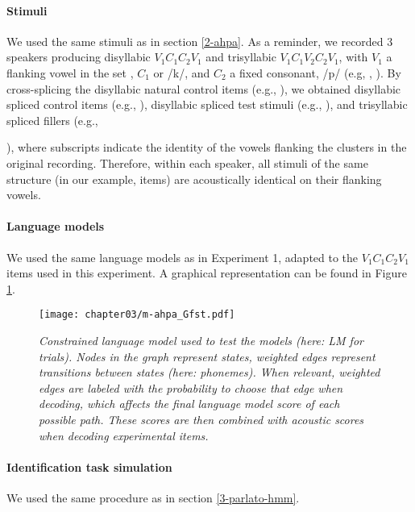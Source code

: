 \paragraph{Stimuli}
We used the same stimuli as in section \ref{2-ahpa}. As a reminder, we recorded 3 speakers producing disyllabic $V_{1}C_{1}C_{2}V_{1}$ and trisyllabic $V_{1}C_{1}V_{2}C_{2}V_{1}$, with $V_{1}$ a flanking vowel in the set , $C_{1}$  or /k/, and $C_{2}$ a fixed consonant, /p/ (e.g, , ). By cross-splicing the disyllabic natural control items (e.g., ), we obtained disyllabic spliced control items (e.g., \texorpdfstring{}{}), disyllabic spliced test stimuli (e.g., \texorpdfstring{}{}), and trisyllabic spliced fillers (e.g., {), where subscripts indicate the identity of the vowels flanking the clusters in the original recording. Therefore, within each speaker, all stimuli of the same structure (in our example,  items) are acoustically identical on their flanking vowels.
  
\paragraph{Language models}
We used the same language models as in Experiment 1, adapted to the $V_{1}C_{1}C_{2}V_{1}$ items used in this experiment. A graphical representation can be found in Figure \ref{fig:m-ahpa_G}.
  
\begin{figure}[htb]
    \centering
    \texttt{[image: chapter03/m-ahpa\_Gfst.pdf]}
    \caption{\textit{Constrained language model used to test the models (here: LM for  trials). Nodes in the graph represent states, weighted edges represent transitions between states (here: phonemes). When relevant, weighted edges are labeled with the probability to choose that edge when decoding, which affects the final language model score of each possible path. These scores are then combined with acoustic scores when decoding experimental items.}}
    \label{fig:m-ahpa_G}
\end{figure}
  
\paragraph{Identification task simulation}
We used the same procedure as in section \ref{3-parlato-hmm}.

}
